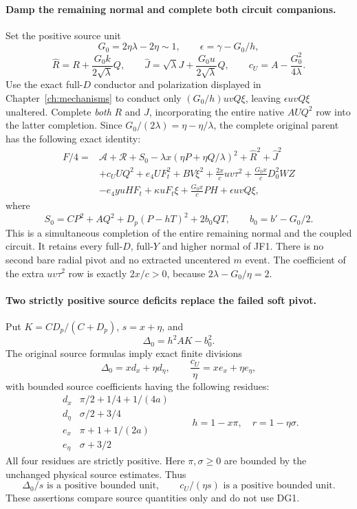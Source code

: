 \paragraph{Damp the remaining normal and complete both circuit companions.}
Set the positive source unit
\[
 G_0=2\eta\lambda-2\eta\sim1,\qquad
 \epsilon=\gamma-G_0/h,
\]
\[
 \widehat R=R+\frac{G_0k}{2\sqrt\lambda}Q,
 \qquad \widehat J=\sqrt\lambda J+
                         \frac{G_0u}{2\sqrt\lambda}Q,
 \qquad c_U=A-\frac{G_0^2}{4\lambda}.
\]
Use the exact full-$D$ conductor and polarization displayed in Chapter~\ref{ch:mechanisms} to conduct only
$(G_0/h)uvQ\xi$, leaving $\epsilon uvQ\xi$ unaltered. Complete
\emph{both} $R$ and $J$, incorporating the entire native $AUQ^2$
row into the latter completion. Since
$G_0/(2\lambda)=\eta-\eta/\lambda$, the complete original parent
has the following exact identity:
\[
\begin{split}
 F/4={}&\mathscr A+\mathscr R+S_0
    -\lambda x(\eta P+\eta Q/\lambda)^2
    +\widehat R^2+\widehat J^2\\
 &+c_UUQ^2+e_4UF_t^2+BV\xi^2
    +\frac{2x}{c}uv\tau^2
    +\frac{G_0x}{c}D_0^2WZ\\
 &-e_4yuHF_t+\kappa uF_t\xi
                 +\frac{G_0x}{c}PH+\epsilon uvQ\xi,       
\end{split}\tag{DG3}
\]
where
\[
 S_0=CP^2+AQ^2+D_p(P-hT)^2+2b_0QT,
 \qquad b_0=b'-G_0/2.                                 \tag{DG4}
\]
This is a simultaneous completion of the entire remaining normal and
the coupled circuit. It retains every full-$D$, full-$Y$ and higher
normal of JF1. There is no second bare radial pivot and no extracted
uncentered $m$ event. The coefficient of the extra $uv\tau^2$ row
is exactly $2x/c>0$, because $2\lambda-G_0/\eta=2$.

\paragraph{Two strictly positive source deficits replace the failed soft pivot.}
Put $K=CD_p/(C+D_p)$, $s=x+\eta$, and
\[
                         \Delta_0=h^2AK-b_0^2.
\]
The original source formulas imply exact finite divisions
\[
 \Delta_0=x d_x+\eta d_\eta,\qquad
 \frac{c_U}{\eta}=x e_x+\eta e_\eta,                \tag{DG5}
\]
with bounded source coefficients having the following residues:
\[
 \begin{array}{c|c}
 d_x&\pi/2+1/4+1/(4a)\\
 d_\eta&\sigma/2+3/4\\
 e_x&\pi+1+1/(2a)\\
 e_\eta&\sigma+3/2
 \end{array}
 \qquad h=1-x\pi,\quad r=1-\eta\sigma.             \tag{DG6}
\]
All four residues are strictly positive. Here $\pi,\sigma\ge0$
are bounded by the unchanged physical source estimates. Thus
\[
 \Delta_0/s\text{ is a positive bounded unit},\qquad
 c_U/(\eta s)\text{ is a positive bounded unit}.     \tag{DG7}
\]
These assertions compare source quantities only and do not use DG1.


